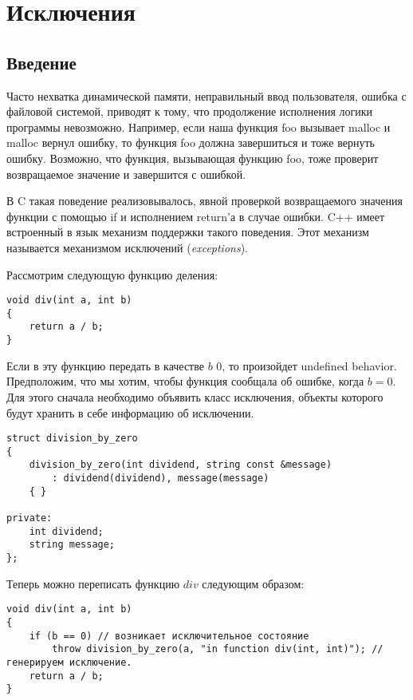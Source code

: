 \section{Исключения}
\subsection{Введение}
Часто нехватка динамической памяти, неправильный ввод пользователя, ошибка с файловой системой, приводят к тому, что продолжение исполнения логики программы невозможно. Например, если наша функция foo вызывает malloc и malloc вернул ошибку, то функция foo должна завершиться и тоже вернуть ошибку. Возможно, что функция, вызывающая функцию foo, тоже проверит возвращаемое значение и завершится с ошибкой.

В C такая поведение реализовывалось, явной проверкой возвращаемого значения функции с помощью if и исполнением return'а в случае ошибки. C++ имеет встроенный в язык механизм поддержки такого поведения. Этот механизм называется механизмом исключений ({\it exceptions}).

Рассмотрим следующую функцию деления:
\begin{verbatim}
void div(int a, int b)
{
    return a / b;
}
\end{verbatim}

Если в эту функцию передать в качестве $b$ $0$, то произойдет undefined behavior. Предположим, что мы хотим, чтобы функция сообщала об ошибке, когда $b = 0$. Для этого сначала необходимо объявить класс исключения, объекты которого будут хранить в себе информацию об исключении.

\begin{verbatim}
struct division_by_zero
{
    division_by_zero(int dividend, string const &message)
        : dividend(dividend), message(message)
    { }

private:
    int dividend;
    string message;
};
\end{verbatim}

Теперь можно переписать функцию $div$ следующим образом:

\begin{verbatim}
void div(int a, int b)
{
    if (b == 0) // возникает исключительное состояние
        throw division_by_zero(a, "in function div(int, int)"); // генерируем исключение.
    return a / b;
}
\end{verbatim}

